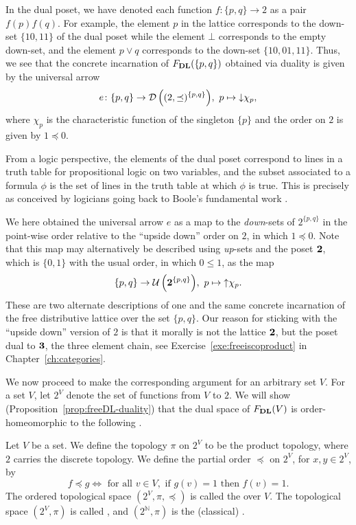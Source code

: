 \begin{example}
  In the dual poset, we have denoted each function $f \colon \{p, q\} \to 2$ as a pair $f(p)f(q)$. For example, the element $p$ in the lattice corresponds to the down-set  $\{10, 11\}$ of the  dual poset while the element $\bot$ corresponds to the empty down-set, and the element $p \vee q$ corresponds to the down-set $\{10, 01, 11\}$.
 Thus, we see that the concrete incarnation of $F_{\mathbf{DL}}(\{p,q\})$ obtained via duality is given by the universal arrow 
\[
e\colon \{p,q\}\to \mathcal{D}\left((2,\preceq)^{\{p,q\}}\right)\!, \ p\mapsto {\downarrow} \chi_{p},
\]
where $\chi_{p}$ is the characteristic function of the singleton $\{p\}$ and the order on $2$ is given by $1\preceq 0$.  
 
From a logic perspective, the elements of the dual poset correspond to lines in a truth table for propositional logic on two variables, and the subset associated to a formula $\phi$ is the set of lines in the truth table at which $\phi$ is true. This is precisely as conceived by logicians going back to Boole's fundamental work \cite{Boole1847}.

We here obtained the universal arrow $e$  as a map to the \emph{down}-sets of $2^{\{p,q\}}$ in the point-wise order relative to the ``upside down'' order on $2$, in which $1\preceq 0$. Note that this map may alternatively be described using \emph{up}-sets and the poset ${\bf 2}$, which is $\{0,1\}$ with the usual order, in which $0\leq 1$, as the map
\[
\{p,q\}\to \mathcal{U}\left({\bf 2}^{\{p,q\}}\right)\!,\  p\mapsto {\uparrow} \chi_{p}.
\]
These are two alternate descriptions of one and the same concrete incarnation of the free distributive lattice over the set $\{p,q\}$. Our reason for sticking with the ``upside down'' version of $2$ is that it morally is not the lattice ${\bf 2}$, but the poset dual to $\bf 3$, the three element chain, see Exercise~\ref{exe:freeiscoproduct} in Chapter~\ref{ch:categories}.
  \end{example}
 We now proceed to make the corresponding argument for an arbitrary set $V$. %
For a set $V$, let $2^V$ denote the set of functions from $V$ to $2$. We will show (Proposition~\ref{prop:freeDL-duality}) that the dual space of $F_{\mathbf{DL}}(V)$ is order-homeomorphic to the following . %

\begin{definition}\label{dfn:ordered-general-cantor}
Let $V$ be a set. We define the topology $\pi$ on $2^V$ to be the product topology, where $2$ carries the discrete topology. We define the partial order $\preceq$ on $2^V$, for $x, y \in 2^V$, by 
  \[ f \preceq g \iff \text{ for all } v \in V, \text{ if } g(v) = 1 \text{ then } f(v) = 1.\]
The ordered topological space $(2^V, \pi, \preceq)$ is called the  over $V$. The topological space $(2^V, \pi)$ is called , and $(2^\mathbb{N}, \pi)$ is the (classical) .
\end{definition}

